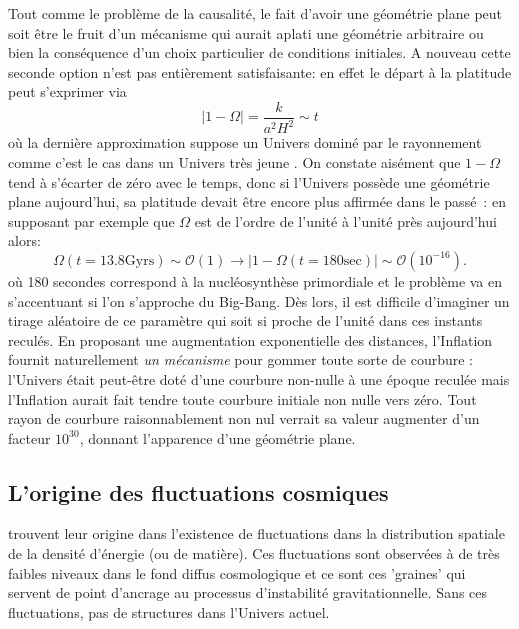 Tout comme le problème de la causalité, le fait d'avoir une géométrie plane peut soit être le fruit d'un mécanisme qui aurait aplati une géométrie arbitraire ou bien la conséquence d'un choix particulier de conditions initiales. A nouveau cette seconde option n'est pas entièrement satisfaisante: en effet le départ à la platitude peut s'exprimer via 
\begin{equation}
|1-\Omega|=\frac{k}{a^2 H^2}\sim t
\end{equation}
où la dernière approximation suppose un Univers dominé par le rayonnement comme c'est le cas dans un Univers très jeune . On constate aisément que $1-\Omega$ tend à s'écarter de zéro avec le temps, donc si l'Univers possède une géométrie plane aujourd'hui, sa platitude devait être encore plus affirmée dans le passé~: en supposant par exemple que $\Omega$ est de l'ordre de l'unité à l'unité près aujourd'hui alors:
\begin{equation}
\Omega (t=13.8 \mathrm{Gyrs}) \sim \mathcal{O} (1) \rightarrow |1-\Omega (t=180 \mathrm{sec})| \sim \mathcal{O} (10^{-16}).
\end{equation}
où 180 secondes correspond à la nucléosynthèse primordiale et le problème va en s'accentuant si l'on s'approche du Big-Bang.
Dès lors, il est difficile d'imaginer un tirage aléatoire de ce paramètre qui soit si proche de l'unité dans ces instants reculés. En proposant une augmentation exponentielle des distances, l'Inflation fournit naturellement \textit{un mécanisme} pour gommer toute sorte de courbure : l'Univers était peut-être doté d'une courbure non-nulle à une époque reculée mais l'Inflation aurait fait tendre toute courbure initiale non nulle vers zéro. Tout rayon de courbure raisonnablement non nul verrait sa valeur augmenter d'un facteur $10^{30}$, donnant l'apparence d'une géométrie plane.

\subsection{L'origine des fluctuations cosmiques}
 trouvent leur origine dans l'existence de fluctuations dans la distribution spatiale de la densité d'énergie (ou de matière). Ces fluctuations sont observées à de très faibles niveaux dans le fond diffus cosmologique et ce sont ces 'graines' qui servent de point d'ancrage au processus d'instabilité gravitationnelle. Sans ces fluctuations, pas de structures dans l'Univers actuel. 

